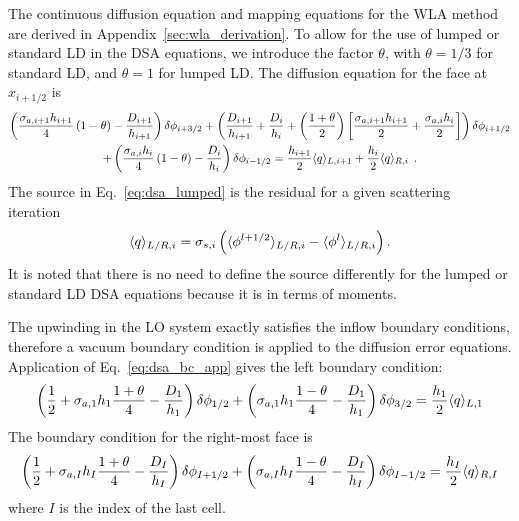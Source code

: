 The continuous diffusion equation and mapping equations for the WLA method are derived in Appendix~\ref{sec:wla_derivation}.
To allow for the use of lumped
or standard LD in the DSA equations, we introduce the factor $\theta$, with
$\theta=1/3$ for standard
LD, and $\theta=1$ for lumped LD.  The diffusion equation for the face at $x_{i+1/2}$ is 
\begin{multline}\label{eq:dsa_lumped}
    \left(\frac{\sigma_{a,i+1} h_{i+1}}{4}\left(1 - \theta\right)  -
        \frac{D_{i+1}}{h_{i+1}}\right)\delta\phi_{i+3/2} + \left(\frac{D_{i+1}}{h_{i+1}} +
        \frac{D_{i}}{h_i} + \left(\frac{1+\theta}{2} \right)\left[\frac{\sigma_{a,i+1} h_{i+1}}{2} + \frac{\sigma_{a,i}
        h_{i}}{2}\right]\right)\delta\phi_{i+1/2} \\ + \left(\frac{\sigma_{a,i}
        h_{i}}{4}\left(1 - \theta\right) -
        \frac{D_{i}}{h_{i}}\right)\delta\phi_{i-1/2} = \frac{h_{i+1}}{2} \langle q \rangle_{L,i+1} +
        \frac{h_{i}}{2}\langle q \rangle_{R,i}
        \;\,. 
\end{multline}
The source in Eq.~\eqref{eq:dsa_lumped} is the residual for a given scattering iteration~\cite{morel_dsa,lewis}
\begin{equation}\label{eq:dsa_src}
    \langle q \rangle_{L/R,i} = \sigma_{s,i}\left(\langle \phi^{l+1/2} \rangle_{L/R,i} -
    \langle \phi^{l} \rangle_{L/R,i}\right).
\end{equation}
It is noted that there is no need to define the source differently for the lumped or
standard LD DSA equations because it is in terms of moments.

The upwinding in the LO system exactly satisfies the inflow boundary conditions, therefore
a vacuum boundary condition is applied to the diffusion error equations.
Application of Eq.~\eqref{eq:dsa_bc_app} gives the left boundary condition:
\begin{equation}\label{eq:bc_dsa}
    \left(\frac{1}{2}+ \sigma_{a,1}h_1\frac{1+\theta}{4} - \frac{D_1}{h_1}\right)\delta\phi_{1/2} +
    \left( {\sigma_{a,1}{h_1}}\frac{1-\theta}{4} - \frac{D_1}{h_1}  \right)\delta \phi_{3/2} =
    \frac{h_1}{2} \langle q \rangle_{L,1}
\end{equation}
The boundary condition for the right-most face is
\begin{equation}\label{eq:bc_dsar}
    \left(\frac{1}{2}+ \sigma_{a,I}h_I\frac{1+\theta}{4} - \frac{D_I}{h_I}\right)\delta\phi_{I+1/2} +
    \left( {\sigma_{a,I}{h_I}}\frac{1-\theta}{4} - \frac{D_I}{h_I}  \right)\delta\phi_{I-1/2} =
    \frac{h_I}{2} \langle q \rangle_{R,I}
\end{equation}
where $I$ is the index of the last cell. 

